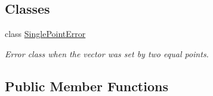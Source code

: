 \subsection*{Classes}
\begin{DoxyCompactItemize}
\item 
class \hyperlink{classtVector_1_1SinglePointError}{Single\+Point\+Error}
\begin{DoxyCompactList}\small\item\em Error class when the vector was set by two equal points. \end{DoxyCompactList}\end{DoxyCompactItemize}
\subsection*{Public Member Functions}
